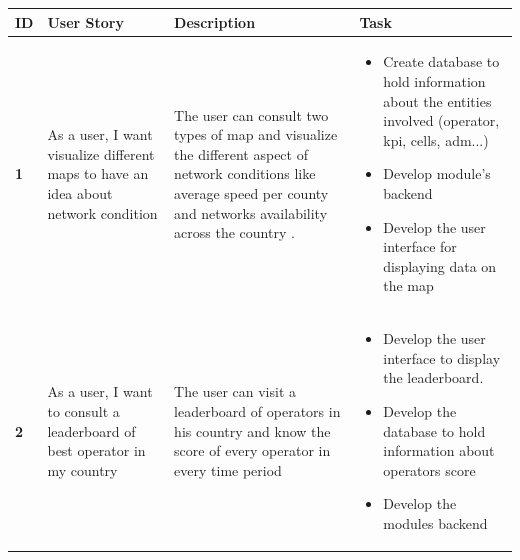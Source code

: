 \begin{table}[H]
    \renewcommand{\arraystretch}{1.2}
    \setlength{\belowcaptionskip}{0.25cm}
 
   \begin{tabular}{|p{}|p{}|p{}|p{}|}
   \hline
   \textbf{ID}  &  \textbf{User Story } & \textbf{Description} & \textbf{Task} \\ \hline


   
   \begin{center}
       \textbf{1}
   \end{center} & \begin{center}
       As a user, I want visualize different maps to have an idea about network condition
   \end{center} &
   \begin{center}
       
   The user can consult two types of map and visualize the different aspect of network conditions like average speed per county and networks availability across the country .
   \end{center}
   & 

       \begin{itemize}[left=0pt, label={\textbf{\Huge .}}]
            \item Create database to hold information about the entities involved (operator, kpi, cells, adm...)
            \item Develop module's backend 
            \item Develop the user interface for displaying data on the map 
        \end{itemize} \\ \hline


   \begin{center}
       \textbf{2}
   \end{center} & \begin{center}
       As a  user, I want to consult a leaderboard of best operator in my country
   \end{center} &
   \begin{center}
       
   
  The  user can visit a leaderboard of operators in his country and know the score of every operator in every time period  
   \end{center}
  & 

       \begin{itemize}[left=0pt, label={\textbf{\Huge .}}]
            \item Develop the user interface to display the leaderboard.
            \item Develop the database to hold information about operators score
            \item Develop the modules backend


\end{itemize}
\end{tabular}
\end{table}
